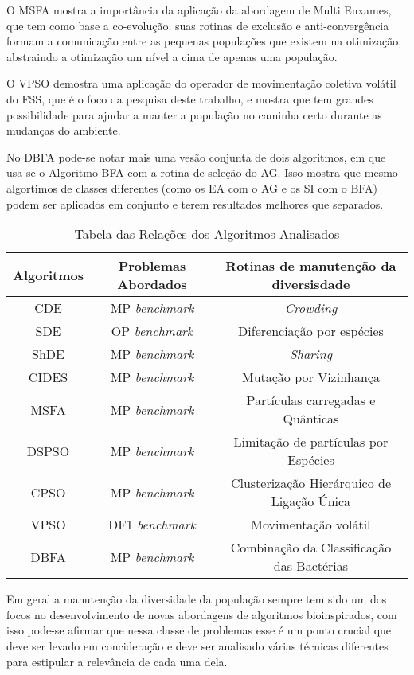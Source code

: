 O MSFA mostra a importância da aplicação da abordagem de Multi Enxames, que tem como base a co-evolução. suas rotinas de exclusão e anti-convergência formam a comunicação entre as pequenas populações que existem na otimização, abstraindo a otimização um nível a cima de apenas uma população.

O VPSO demostra uma aplicação do operador de movimentação coletiva volátil do FSS, que é o foco da pesquisa deste trabalho, e mostra que tem grandes possibilidade para ajudar a manter a população no caminha certo durante as mudanças do ambiente.

No DBFA pode-se notar mais uma vesão conjunta de dois algoritmos, em que usa-se o Algoritmo BFA com a rotina de seleção do AG. Isso mostra que mesmo algortimos de classes diferentes (como os EA com o AG e os SI com o BFA) podem ser aplicados em conjunto e terem resultados melhores que separados.

\begin{table}[]
	\label{tab:problems_table}
	\centering
	\caption{Tabela das Relações dos Algoritmos Analisados}
	\label{my-label}
	\begin{tabular}{|c|c|c|}
		\hline
		Algoritmos & Problemas Abordados & Rotinas de manutenção da diversisdade \\ \hline
		CDE        & MP \textit{benchmark}   & \textit{Crowding} \\ \hline
		SDE        & OP \textit{benchmark}   & Diferenciação por espécies \\ \hline
		ShDE       & MP \textit{benchmark}   & \textit{Sharing} \\ \hline
		CIDES      & MP \textit{benchmark}   & Mutação por Vizinhança \\ \hline
		MSFA       & MP \textit{benchmark}   & Partículas carregadas e Quânticas \\ \hline
		DSPSO      & MP \textit{benchmark}   & Limitação de partículas por Espécies \\ \hline
		CPSO       & MP \textit{benchmark}   & Clusterização Hierárquico de Ligação Única \\ \hline
		VPSO       & DF1 \textit{benchmark}  & Movimentação volátil \\ \hline
		DBFA       & MP \textit{benchmark}   & Combinação da Classificação das Bactérias \\ \hline
	\end{tabular}
\end{table}

Em geral a manutenção da diversidade da população sempre tem sido um dos focos no desenvolvimento de novas abordagens de algoritmos bioinspirados, com isso pode-se afirmar que nessa classe de problemas esse é um ponto crucial que deve ser levado em concideração e deve ser analisado várias técnicas diferentes para estipular a relevância de cada uma dela.